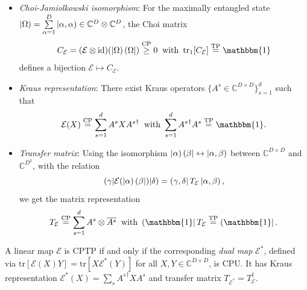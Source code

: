 \begin{itemize}
	\item \textit{Choi-Jamiolkowski isomorphism}: For the maximally entangled state $\left| \Omega \right) = \sum\limits_{\alpha = 1}^D \left| \alpha, \alpha \right) \in \mathbb{C}^D \otimes \mathbb{C}^D$, the Choi matrix
	\begin{equation}
		C_{\mathcal{E}} = (\mathcal{E} \otimes \mathrm{id}) (\tket{\Omega} \tbra{\Omega}) \overset{\mathrm{CP}}{\geq} 0 \: \text{ with } \tr_1[C_{\mathcal{E}}] \overset{\mathrm{TP}}{=} \mathbbm{1}
	\end{equation}
	defines a bijection $\mathcal{E} \mapsto C_{\mathcal{E}}$.
	
	\item \textit{Kraus representation}: There exist Kraus operators $\{A^s \in \mathbb{C}^{D \times D}\}_{s=1}^d$ such that
	\begin{equation}
		\mathcal{E}(X) \overset{\mathrm{CP}}{=} \sum_{s=1}^d A^s X {A^s}^{\dagger} \: \text{ with }  \sum_{s=1}^d {A^s}^{\dagger} A^s \overset{\mathrm{TP}}{=} \mathbbm{1}.
	\end{equation}
	
	\item \textit{Transfer matrix}: Using the isomorphism $\left| \alpha \right)\left( \beta \right| \leftrightarrow \left| \alpha, \beta \right) $ between $\mathbb{C}^{D \times D}$ and $\mathbb{C}^{D^2}$, with the relation
	\begin{equation}
		( \gamma \vert \mathcal{E}( \left| \alpha \right) \left( \beta \right| ) \vert \delta ) = \left( \gamma, \delta \right| T_{\mathcal{E}} \left| \alpha, \beta \right),
	\end{equation}
	we get the matrix representation
	\begin{equation}
		T_{\mathcal{E}} \overset{\mathrm{CP}}{=} \sum_{s=1}^d A^s \otimes \overline{A^s} \: \text{ with }  \tbra{\mathbbm{1}} T_{\mathcal{E}} \overset{\mathrm{TP}}{=} \tbra{\mathbbm{1}}.
	\end{equation}
\end{itemize}

\noindent A linear map $\mathcal{E}$ is CPTP if and only if the corresponding \textit{dual map} $\mathcal{E}^*$, defined via $\mathrm{tr}[\mathcal{E}(X) Y] = \mathrm{tr}[X \mathcal{E}^*(Y)]$ for all $X, Y \in \mathbb{C}^{D \times D}$, is CPU. It has Kraus representation $\mathcal{E}^*(X) = \sum_{s} {A^s}^{\dagger} X A^s$ and transfer matrix $T_{\mathcal{E}^*} = T_{\mathcal{E}}^{\dagger}$. \cite{wolf2012channels, wolf2022information} \\

